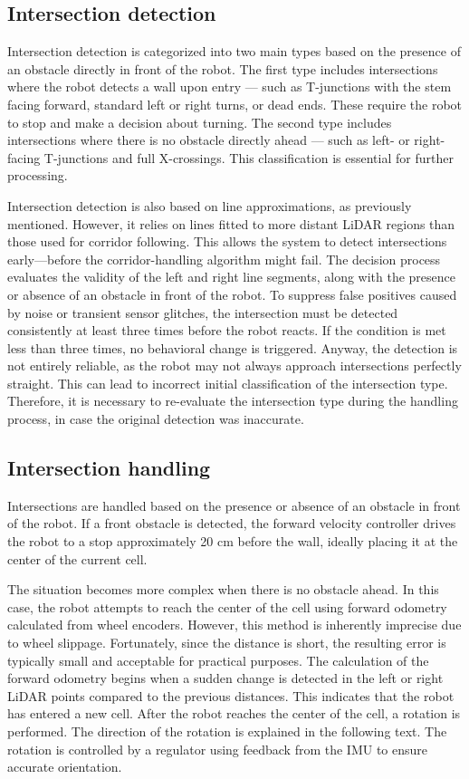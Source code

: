 \subsection{Intersection detection}
Intersection detection is categorized into two main types based on the presence of an obstacle directly in front of the robot. The first type includes intersections where the robot detects a wall upon entry — such as T-junctions with the stem facing forward, standard left or right turns, or dead ends. These require the robot to stop and make a decision about turning. The second type includes intersections where there is no obstacle directly ahead — such as left- or right-facing T-junctions and full X-crossings. This classification is essential for further processing. 

Intersection detection is also based on line approximations, as previously mentioned. However, it relies on lines fitted to more distant LiDAR regions than those used for corridor following. This allows the system to detect intersections early—before the corridor-handling algorithm might fail. The decision process evaluates the validity of the left and right line segments, along with the presence or absence of an obstacle in front of the robot. To suppress false positives caused by noise or transient sensor glitches, the intersection must be detected consistently at least three times before the robot reacts. If the condition is met less than three times, no behavioral change is triggered. Anyway, the detection is not entirely reliable, as the robot may not always approach intersections perfectly straight. This can lead to incorrect initial classification of the intersection type. Therefore, it is necessary to re-evaluate the intersection type during the handling process, in case the original detection was inaccurate.

\subsection{Intersection handling}
Intersections are handled based on the presence or absence of an obstacle in front of the robot. If a front obstacle is detected, the forward velocity controller drives the robot to a stop approximately 20 cm before the wall, ideally placing it at the center of the current cell.

The situation becomes more complex when there is no obstacle ahead. In this case, the robot attempts to reach the center of the cell using forward odometry calculated from wheel encoders. However, this method is inherently imprecise due to wheel slippage. Fortunately, since the distance is short, the resulting error is typically small and acceptable for practical purposes. The calculation of the forward odometry begins when a sudden change is detected in the left or right LiDAR points compared to the previous distances. This indicates that the robot has entered a new cell. After the robot reaches the center of the cell, a rotation is performed. The direction of the rotation is explained in the following text. The rotation is controlled by a regulator using feedback from the IMU to ensure accurate orientation.

